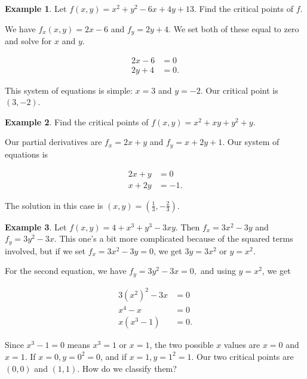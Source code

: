\documentclass[
]{book}
\theoremstyle{definition}
\theoremstyle{definition}
\newtheorem{example}{Example}[chapter]
\theoremstyle{definition}
\theoremstyle{definition}
\theoremstyle{remark}
\begin{document}
\begin{examplebox}

\begin{example}
\protect\hypertarget{exm:cp1}{}\label{exm:cp1}Let \(f(x,y)=x^2+y^2-6x+4y+13\). Find the critical points of \(f\).

We have \(f_x(x,y)=2x-6\) and \(f_y=2y+4.\) We set both of these equal to zero and solve for \(x\) and \(y\).

\begin{align*}
    2x-6&=0\\
    2y+4&=0.
\end{align*}

This system of equations is simple: \(x=3\) and \(y=-2\). Our critical point is \((3,-2).\)
\end{example}

\end{examplebox}

\begin{examplebox}

\begin{example}
\protect\hypertarget{exm:cp2}{}\label{exm:cp2}Find the critical points of \(f(x,y)=x^2+xy+y^2+y\).

Our partial derivatives are \(f_x=2x+y\) and \(f_y=x+2y+1.\) Our system of equations is

\begin{align*}
    2x+y&=0\\
    x+2y&=-1.
\end{align*}

The solution in this case is \((x,y)=(\frac13,-\frac23).\)
\end{example}

\end{examplebox}

\begin{examplebox}

\begin{example}
\protect\hypertarget{exm:cp3}{}\label{exm:cp3}Let \(f(x,y)=4+x^3+y^3-3xy\). Then \(f_x=3x^2-3y\) and \(f_y=3y^2-3x.\) This one's a bit more complicated because of the squared terms involved, but if we set \(f_x=3x^2-3y=0\), we get \(3y=3x^2\) or \(y=x^2\).

For the second equation, we have \(f_y=3y^2-3x=0,\) and using \(y=x^2\), we get

\begin{align*}
    3(x^2)^2-3x&=0\\
    x^4-x&=0\\
    x(x^3-1)&=0.
\end{align*}

Since \(x^3-1=0\) means \(x^3=1\) or \(x=1\), the two possible \(x\) values are \(x=0\) and \(x=1\). If \(x=0,y=0^2=0\), and if \(x=1,y=1^2=1\). Our two critical points are \((0,0)\) and \((1,1)\). How do we classify them?
\end{example}

\end{examplebox}
\end{document}
